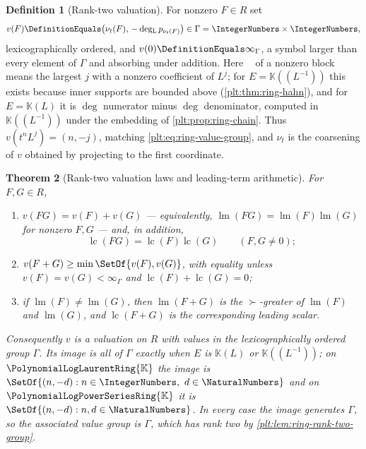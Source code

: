 \documentclass[11pt,oneside]{article}
\theoremstyle{plain}
\newtheorem{theorem}{Theorem}[section]
\theoremstyle{definition}
\newtheorem{definition}[theorem]{Definition}
\theoremstyle{remark}
\newcommand{\K}{\mathbb{K}}
\newcommand{\PLpow}{\PolynomialLogPowerSeriesRing{\K}}   %
\newcommand{\PLlau}{\PolynomialLogLaurentRing{\K}}       %
\newcommand{\ordt}{\nu_{t}}                              %
\DeclareMathOperator{\lm}{lm}
\DeclareMathOperator{\lc}{lc}
\DeclareMathOperator{\degL}{deg_{L}}
\newcommand{\succdom}{\succ}
\begin{document}
\begin{definition}[Rank-two valuation]
\label{plt:def:ring-rank-two}
For nonzero \(F\in R\) set
\begin{equation}\label{plt:eq:lead-rank-two}
  v(F)\DefinitionEquals\bigl(\ordt(F),\,-\degL p_{\ordt(F)}\bigr)
  \in\Gamma=\IntegerNumbers\times\IntegerNumbers,
\end{equation}
lexicographically ordered, and \(v(0)\DefinitionEquals\infty_\Gamma\), a
symbol larger than every element of \(\Gamma\) and absorbing under addition.
Here \(\degL\) of a nonzero block means the largest \(j\) with a nonzero
coefficient of \(L^{j}\); for \(E=\K((L^{-1}))\) this exists because inner
supports are bounded above (\cref{plt:thm:ring-hahn}), and for
\(E=\K(L)\) it is \(\deg\) numerator minus \(\deg\) denominator, computed in
\(\K((L^{-1}))\) under the embedding of \cref{plt:prop:ring-chain}.
Thus \(v(t^nL^j)=(n,-j)\), matching \eqref{plt:eq:ring-value-group}, and
\(\ordt\) is the coarsening of \(v\) obtained by projecting to the first
coordinate.
\end{definition}

\begin{theorem}[Rank-two valuation laws and leading-term arithmetic]
\label{plt:thm:lead-rank-two-laws}
For \(F,G\in R\),
\begin{enumerate}[label=\textup{(\roman*)}]
\item \(v(FG)=v(F)+v(G)\) --- equivalently, \(\lm(FG)=\lm(F)\lm(G)\) for
  nonzero \(F,G\) --- and, in addition,
  \[
    \lc(FG)=\lc(F)\lc(G)\qquad(F,G\ne0);
  \]
\item \(v(F+G)\ge\min\SetOf{v(F),v(G)}\), with equality unless
  \(v(F)=v(G)<\infty_\Gamma\) and \(\lc(F)+\lc(G)=0\);
\item if \(\lm(F)\ne\lm(G)\), then \(\lm(F+G)\) is the \(\succdom\)-greater of
  \(\lm(F)\) and \(\lm(G)\), and \(\lc(F+G)\) is the corresponding leading
  scalar.
\end{enumerate}
Consequently \(v\) is a valuation on \(R\) with values in the
lexicographically ordered group \(\Gamma\).  Its image is all of \(\Gamma\)
exactly when \(E\) is \(\K(L)\) or \(\K((L^{-1}))\); on \(\PLlau\) the image
is \(\SetOf{(n,-d):n\in\IntegerNumbers,\ d\in\NaturalNumbers}\) and on
\(\PLpow\) it is \(\SetOf{(n,-d):n,d\in\NaturalNumbers}\).  In every case the
image generates \(\Gamma\), so the associated value group is \(\Gamma\), which
has rank two by \cref{plt:lem:ring-rank-two-group}.
\end{theorem}
\end{document}
